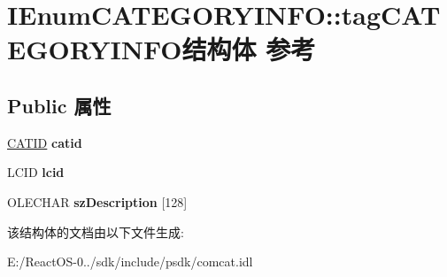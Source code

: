 \hypertarget{struct_i_enum_c_a_t_e_g_o_r_y_i_n_f_o_1_1tag_c_a_t_e_g_o_r_y_i_n_f_o}{}\section{I\+Enum\+C\+A\+T\+E\+G\+O\+R\+Y\+I\+N\+FO\+:\+:tag\+C\+A\+T\+E\+G\+O\+R\+Y\+I\+N\+F\+O结构体 参考}
\label{struct_i_enum_c_a_t_e_g_o_r_y_i_n_f_o_1_1tag_c_a_t_e_g_o_r_y_i_n_f_o}
\subsection*{Public 属性}
\begin{DoxyCompactItemize}
\item 
\mbox{\label{struct_i_enum_c_a_t_e_g_o_r_y_i_n_f_o_1_1tag_c_a_t_e_g_o_r_y_i_n_f_o_aa8cdb165845b7928d81fc01ebb961dc2}} 
\hyperlink{interface_g_u_i_d}{C\+A\+T\+ID} {\bfseries catid}
\item 
\mbox{\label{struct_i_enum_c_a_t_e_g_o_r_y_i_n_f_o_1_1tag_c_a_t_e_g_o_r_y_i_n_f_o_afd2b276e1f2a0339a8a5d2feabcd7e31}} 
L\+C\+ID {\bfseries lcid}
\item 
\mbox{\label{struct_i_enum_c_a_t_e_g_o_r_y_i_n_f_o_1_1tag_c_a_t_e_g_o_r_y_i_n_f_o_a615ed52ba2870b4b613b8d05c60000ce}} 
O\+L\+E\+C\+H\+AR {\bfseries sz\+Description} \mbox{[}128\mbox{]}
\end{DoxyCompactItemize}


该结构体的文档由以下文件生成\+:\begin{DoxyCompactItemize}
\item 
E\+:/\+React\+O\+S-\/0../sdk/include/psdk/comcat.\+idl\end{DoxyCompactItemize}
